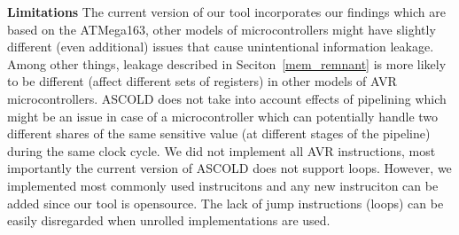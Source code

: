 \textbf{Limitations} The current version of our tool
incorporates our findings which are based on the ATMega163, other models of microcontrollers
might have slightly different (even additional) issues that cause unintentional information leakage.
Among other things, leakage described in Seciton~\ref{mem_remnant} is more likely to be different (affect different sets of registers) in other models of AVR microcontrollers.
ASCOLD does not take into account effects of pipelining which might be an issue
in case of a microcontroller which can potentially handle two different shares of the same sensitive
value (at different stages of the pipeline) during the same clock cycle.
We did not implement all AVR instructions, most importantly
the current version of ASCOLD does not support loops.
However, we implemented most commonly used instrucitons and any new instruciton
can be added since our tool is opensource. The lack of jump instructions (loops)
can be easily disregarded when unrolled implementations are used.